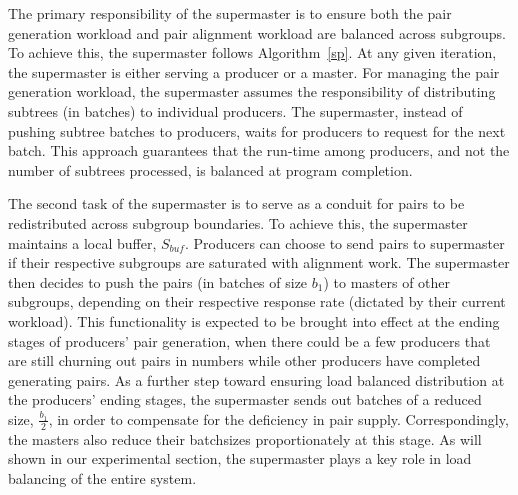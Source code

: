 \documentclass[10pt,journal,letterpaper,compsoc]{IEEEtran}
\begin{document}
The primary responsibility of the supermaster is to ensure both the pair generation workload and pair alignment workload are balanced across subgroups. To achieve this, the supermaster follows Algorithm~\ref{sp}. At any given iteration, the supermaster is either serving a producer or a master. For managing the pair generation workload, the supermaster assumes the responsibility of distributing subtrees (in batches) to individual producers. The supermaster, instead of pushing subtree batches to producers, waits for producers to request for the next batch. This approach guarantees that the run-time among producers, and not the number of subtrees processed, is balanced at program completion. 

The second task of the supermaster is to serve as a conduit for pairs to be redistributed across subgroup boundaries. To achieve this, the supermaster maintains a local buffer, $S_{buf}$. Producers can choose to send pairs to supermaster if their respective subgroups are saturated with alignment work. The supermaster then decides to push the pairs (in batches of size $b_1$) to masters of other subgroups, depending on their respective response rate (dictated by their current workload). This functionality is expected to be brought into effect at the ending stages of producers' pair generation, when there could be a few producers that are still churning out pairs in numbers while other producers have completed generating pairs. As a further step toward ensuring load balanced distribution at the producers' ending stages, the supermaster sends out batches of a reduced size, $\frac{b_1}{2}$, in order to compensate for the deficiency in pair supply. Correspondingly, the masters also reduce their batchsizes proportionately at this stage. As will shown in our experimental section, the supermaster plays a key role in load balancing of the entire system.
\end{document}
